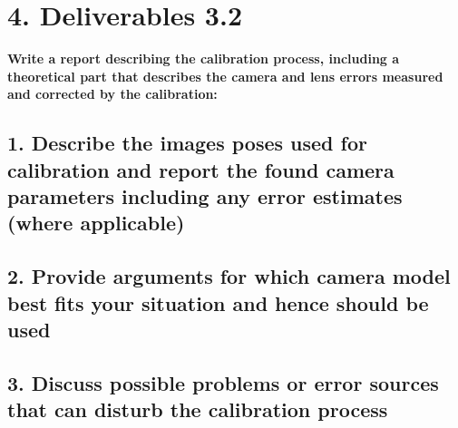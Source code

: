 \section*{4. Deliverables 3.2}
\textbf{Write a report describing the calibration process, including a theoretical part that describes the camera and lens errors measured and corrected by the calibration:}
\subsection*{1. Describe the images poses used for calibration and report the found camera parameters including any error estimates (where applicable)}

\subsection*{2. Provide arguments for which camera model best fits your situation and hence should be used}

\subsection*{3. Discuss possible problems or error sources that can disturb the calibration process}
